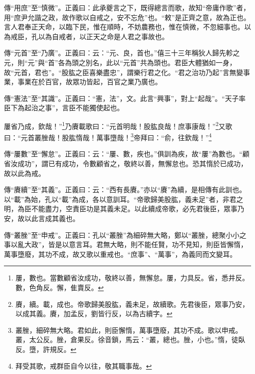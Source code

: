{\noindent\zhuan{}\fzbyks 傳“用庶”至“慎微”。正義曰：此承夔言之下，既得總言而歌，故知“帝庸作歌”者，用“庶尹允諧之政，故作歌以自戒之，安不忘危”也。“敕”是正齊之意，故為正也。言人君奉正天命，以臨下民，惟在順時，不妨農務也，惟在慎微，不忽細事也。以為戒臣，孔以為自戒者，以正天之命是人君之事故也。 \par}

{\noindent\zhuan{}\fzbyks 傳“元首”至“乃廣”。正義曰：云：“元、良，首也。”僖三十三年稱狄人歸先軫之元，則“元”與“首”各為頭之別名，此以“元首”共為頭也。君臣大體猶如一身，故“元首，君也”。“股肱之臣喜樂盡忠”，謂樂行君之化。“君之治功乃起”言無變事業，事業在於百官，故眾功皆起，百官之業乃廣也。 \par}

{\noindent\zhuan{}\fzbyks 傳“憲法”至“其識”。正義曰：“憲，法”，文。此言“興事”，對上“起哉”。“天子率臣下為起治之事”，言臣不能獨使起也。 \par}

屢省乃成，欽哉！”\footnote{屢，數也。當數顧省汝成功，敬終以善，無懈怠。屢，力具反。省，悉井反。數，色角反。懈，隹賣反。}乃賡載歌曰：“元首明哉！股肱良哉！庶事康哉！”\footnote{賡，續。載，成也。帝歌歸美股肱，義未足，故續歌。先君後臣，眾事乃安，以成其義。賡，加孟反，劉皆行反，以為古續字。}又歌曰：“元首叢脞哉！股肱惰哉！萬事墮哉！\footnote{叢脞，細碎無大略。君如此，則臣懈惰，萬事墮廢，其功不成。歌以申戒。叢，太公反。脞，倉果反。徐音鎖，馬云：“叢，總也。脞，小也。”惰，徒臥反。墮，許規反。}帝拜曰：“俞，往欽哉！”\footnote{拜受其歌，戒群臣自今以往，敬其職事哉。}

{\noindent\zhuan{}\fzbyks 傳“屢數”至“懈怠”。正義曰：云：“屢、數，疾也。”俱訓為疾，故“屢”為數也。“顧省汝成功”，謂已有成功，令數顧省之，敬終以善，無懈怠也。恐其惰於已成功，故以此為戒。 \par}

{\noindent\zhuan{}\fzbyks 傳“賡續”至“其義”。正義曰：云：“西有長賡。”亦以“賡”為續，是相傳有此訓也。以“載”為始，孔以“載”為成，各以意訓耳。“帝歌歸美股肱，義未足”者，非君之明，為臣不能盡力，空責臣功是其義未足。以此續成帝歌，必先君後臣，眾事乃安，故以此言成其義也。 \par}

{\noindent\zhuan{}\fzbyks 傳“叢脞”至“申戒”。正義曰：孔以“叢脞”為細碎無大略，鄭以“叢脞，總聚小小之事以亂大政”，皆是以意言耳。君無大略，則不能任賢，功不見知，則臣皆懈惰，萬事墮廢，其功不成，故又歌以重戒也。“庶事”、“萬事”，為義同而文變耳。 \par}


